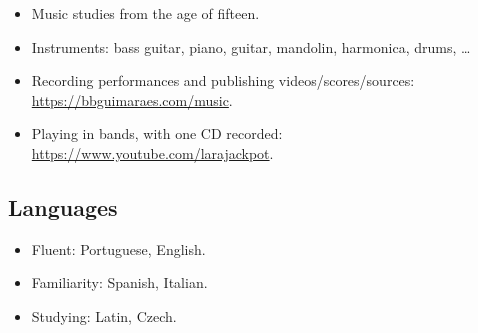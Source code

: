\begin{itemize}
    \item Music studies from the age of fifteen.
    \item
        Instruments: bass guitar, piano, guitar, mandolin, harmonica, drums, …
    \item
        Recording performances and publishing videos/scores/sources:
        \url{https://bbguimaraes.com/music}.
    \item
        Playing in bands, with one CD recorded:
        \url{https://www.youtube.com/larajackpot}.
\end{itemize}

\subsection*{Languages}

\begin{itemize}
    \item Fluent: Portuguese, English.
    \item Familiarity: Spanish, Italian.
    \item Studying: Latin, Czech.
\end{itemize}
